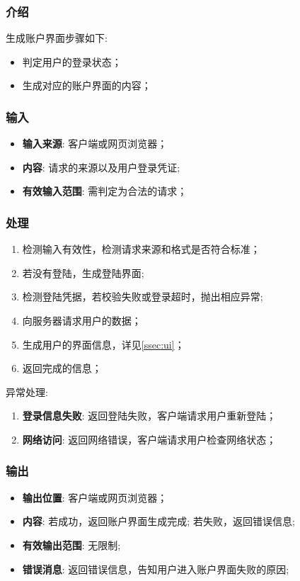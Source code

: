 \subsubsection{介绍}
	生成账户界面步骤如下: 
	\begin{itemize}
		\item 判定用户的登录状态；
		\item 生成对应的账户界面的内容；
	\end{itemize}
\subsubsection{输入}
	\begin{itemize}
		\item \textbf{输入来源}: 客户端或网页浏览器；
		\item \textbf{内容}: 请求的来源以及用户登录凭证;
		\item \textbf{有效输入范围}: 需判定为合法的请求；
	\end{itemize}
\subsubsection{处理}
	\begin{enumerate}
		\item 检测输入有效性，检测请求来源和格式是否符合标准；
		\item 若没有登陆，生成登陆界面;
		\item 检测登陆凭据，若校验失败或登录超时，抛出相应异常;
		\item 向服务器请求用户的数据；
		\item 生成用户的界面信息，详见\ref{ssec:ui}；
		\item 返回完成的信息；
	\end{enumerate}
	\noindent 异常处理: 
	\begin{enumerate}
		\item \textbf{登录信息失败}: 返回登陆失败，客户端请求用户重新登陆；
		\item \textbf{网络访问}: 返回网络错误，客户端请求用户检查网络状态；
	\end{enumerate}
\subsubsection{输出}
\begin{itemize}
	\item \textbf{输出位置}: 客户端或网页浏览器；
	\item \textbf{内容}: 若成功，返回账户界面生成完成; 若失败，返回错误信息;
	\item \textbf{有效输出范围}: 无限制;
	\item \textbf{错误消息}: 返回错误信息，告知用户进入账户界面失败的原因;
\end{itemize}
